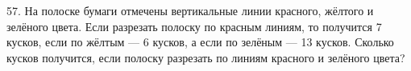 57. На полоске бумаги отмечены вертикальные линии красного, жёлтого и зелёного цвета. Если разрезать полоску по красным линиям, то получится 7 кусков, если по жёлтым --- 6 кусков, а если по зелёным --- 13 кусков. Сколько кусков получится, если полоску разрезать по линиям красного и зелёного цвета?\\
